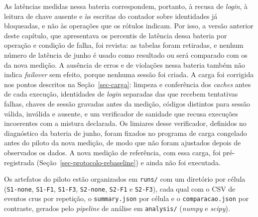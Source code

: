 As latências medidas nessa bateria correspondem, portanto, à recusa de \emph{login}, à leitura de chave ausente e às escritas do contador sobre identidades já bloqueadas, e não às operações que os rótulos indicam. Por isso, a versão anterior deste capítulo, que apresentava os percentis de latência dessa bateria por operação e condição de falha, foi revista: as tabelas foram retiradas, e nenhum número de latência de junho é usado como resultado ou será comparado com os da nova medição. A ausência de erros e de violações nessa bateria também não indica \emph{failover} sem efeito, porque nenhuma sessão foi criada. A carga foi corrigida nos pontos descritos na Seção~\ref{sec-carga}: limpeza e conferência dos \emph{caches} antes de cada execução, identidades de \emph{login} separadas das que recebem tentativas falhas, chaves de sessão gravadas antes da medição, códigos distintos para sessão válida, inválida e ausente, e um verificador de sanidade que recusa execuções incoerentes com a mistura declarada. Os limiares desse verificador, definidos no diagnóstico da bateria de junho, foram fixados no programa de carga congelado antes do piloto da nova medição, de modo que não foram ajustados depois de observados os dados. A nova medição de referência, com essa carga, foi pré-registrada (Seção~\ref{sec-protocolo-rebaseline}) e ainda não foi executada.

Os artefatos do piloto estão organizados em \texttt{runs/} com um diretório por célula (\texttt{S1-none}, \texttt{S1-F1}, \texttt{S1-F3}, \texttt{S2-none}, \texttt{S2-F1} e \texttt{S2-F3}), cada qual com o CSV de eventos crus por repetição, o \texttt{summary.json} por célula e o \texttt{comparacao.json} por contraste, gerados pelo \emph{pipeline} de análise em \texttt{analysis/} (\emph{numpy} e \emph{scipy}).

